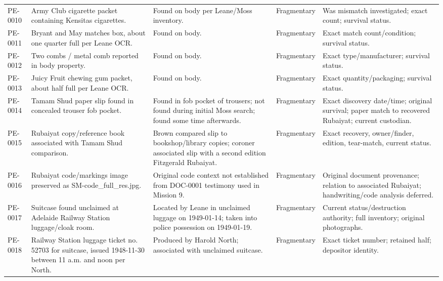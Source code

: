 \begin{longtable}{p{}p{}p{}p{}p{}}
PE-0010 & Army Club cigarette packet containing Kensitas cigarettes. & Found on body per Leane/Moss inventory. & Fragmentary & Was mismatch investigated; exact count; survival status. \\
PE-0011 & Bryant and May matches box, about one quarter full per Leane OCR. & Found on body. & Fragmentary & Exact match count/condition; survival status. \\
PE-0012 & Two combs / metal comb reported in body property. & Found on body. & Fragmentary & Exact type/manufacturer; survival status. \\
PE-0013 & Juicy Fruit chewing gum packet, about half full per Leane OCR. & Found on body. & Fragmentary & Exact quantity/packaging; survival status. \\
PE-0014 & Tamam Shud paper slip found in concealed trouser fob pocket. & Found in fob pocket of trousers; not found during initial Moss search; found some time afterwards. & Fragmentary & Exact discovery date/time; original survival; paper match to recovered Rubaiyat; current custodian. \\
PE-0015 & Rubaiyat copy/reference book associated with Tamam Shud comparison. & Brown compared slip to bookshop/library copies; coroner associated slip with a second edition Fitzgerald Rubaiyat. & Fragmentary & Exact recovery, owner/finder, edition, tear-match, current status. \\
PE-0016 & Rubaiyat code/markings image preserved as SM-code\_full\_res.jpg. & Original code context not established from DOC-0001 testimony used in Mission 9. & Fragmentary & Original document provenance; relation to associated Rubaiyat; handwriting/code analysis deferred. \\
PE-0017 & Suitcase found unclaimed at Adelaide Railway Station luggage/cloak room. & Located by Leane in unclaimed luggage on 1949-01-14; taken into police possession on 1949-01-19. & Fragmentary & Current status/destruction authority; full inventory; original photographs. \\
PE-0018 & Railway Station luggage ticket no. 52703 for suitcase, issued 1948-11-30 between 11 a.m. and noon per North. & Produced by Harold North; associated with unclaimed suitcase. & Fragmentary & Exact ticket number; retained half; depositor identity. \\
\bottomrule
\end{longtable}
